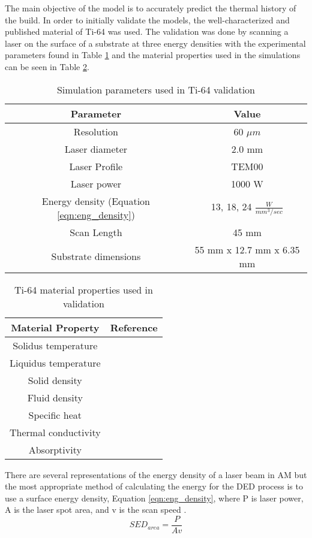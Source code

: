 The main objective of the model is to accurately predict the thermal history of the build.  
In order to initially validate the models, the well-characterized and published material of Ti-64 was used.  The validation was done by scanning a laser on the surface of a substrate at three energy densities with the experimental parameters found in Table \ref{tab:ti64_parameters} and the material properties used in the simulations can be seen in Table \ref{tab:ti64_properties}.
\begin{table}[!htb] \centering
	\caption{Simulation parameters used in Ti-64 validation}
	\label{tab:ti64_parameters}
		\begin{tabular}{|c|c|} \hline 
			Parameter & Value \\ \hline
			Resolution & 60 $\mu m$ \\ \hline
			Laser diameter & 2.0 mm \\ \hline
			Laser Profile & TEM00 \\ \hline
			Laser power & 1000 W \\ \hline
			Energy density (Equation \ref{eqn:eng_density}) & 13, 18, 24 $\frac{W}{mm^3/sec}$ \\ \hline
			Scan Length & 45 mm \\ \hline
			Substrate dimensions & 55 mm x 12.7 mm x 6.35 mm \\ \hline
		\end{tabular}
\end{table}
\begin{table}[!htb] \centering
	\caption{Ti-64  material properties used in validation}
	\label{tab:ti64_properties}
	\begin{tabular}{|c|c|} \hline
		Material Property & Reference \\ \hline
		Solidus temperature & \cite{welschgerhard_1993} \\ \hline
		Liquidus temperature & \cite{mills_2002} \\ \hline
		Solid density  & \cite{mills_2002} \\ \hline
		Fluid density & \cite{mills_2002} \\ \hline
		Specific heat & \cite{boivineau_2006} \\ \hline
		Thermal conductivity & \cite{boivineau_2006} \\ \hline
		Absorptivity & \cite{fan_2012} \\ \hline
	\end{tabular}
\end{table}

There are several representations of the energy density of a laser beam in \ac{AM} but the most appropriate method of calculating the energy for the \ac{DED} process is to use a surface energy density, Equation \ref{eqn:eng_density}, where P is laser power, A is the laser spot area, and v is the scan speed \cite{kurzynowskiEffectScanningSupport2019}.
\begin{equation}
	SED_{area} = \frac{P}{A v} \label{eqn:eng_density}
\end{equation}



